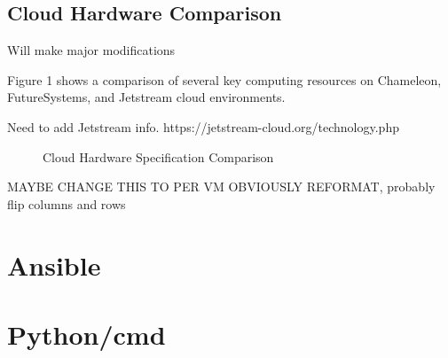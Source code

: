 \documentclass[9pt,twocolumn,twoside]{../../styles/osajnl}
\begin{document}
\subsection{Cloud Hardware Comparison}


Will make major modifications

Figure 1 shows a comparison of several key computing resources on Chameleon, FutureSystems, and Jetstream cloud environments.

Need to add Jetstream info.
https://jetstream-cloud.org/technology.php

\begin{figure}[ht]
  \caption{Cloud Hardware Specification Comparison} \cite{www-chamHardware} \cite{www-kiloHardware} 
\end{figure}

MAYBE CHANGE THIS TO PER VM
OBVIOUSLY REFORMAT, probably flip columns and rows

\section{Ansible}

\section{Python/cmd}
\end{document}
